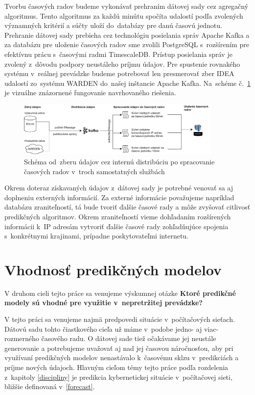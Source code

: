 \documentclass[thesismargins, thesislinespacing, openright, upjsfrontpage]{rnthesis}
\begin{document}
Tvorbu časových radov budeme vykonávať prehraním dátovej sady cez agregačný algoritmus. Tento algoritmus za každú minútu spočíta udalostí podľa zvolených významných kritérií a súčty uloží do~databázy pre danú časovú jednotu. Prehranie dátovej sady prebieha cez technológiu posielania správ Apache Kafka a za databázu pre uloženie časových radov sme zvolili PostgreSQL s~rozšírením pre efektívnu prácu s~časovými radmi TimescaleDB. Prístup posielania správ je zvolený z~dôvodu podpory neustáleho príjmu údajov. Pre spustenie rovnakého systému v~reálnej prevádzke budeme potrebovať len presmerovať zber IDEA udalostí zo~systému WARDEN do~našej inštancie Apache Kafka. Na~schéme č.~\ref{fig:c1_schema} je vizuálne znázornené fungovanie navrhovaného riešenia.

\begin{figure}[h]
  \centering
  \includegraphics[width=0.9\textwidth]{images/metodologia1.png}
  \caption{Schéma od~zberu údajov cez internú distribúciu po spracovanie časových radov v~troch samostatných službách}
  \label{fig:c1_schema}
\end{figure}

Okrem doteraz získavaných údajov z~dátovej sady je potrebné venovať sa aj doplneniu externých informácií. Za externé informácie považujeme napríklad databázu zraniteľností, tá bude tvoriť ďalšie časové rady a môže zvyšovať citlivosť predikčných algoritmov. Okrem zraniteľností vieme dohľadaním rozšírených informácii k~IP adresám vytvoriť ďalšie časové rady zohľadňujúce spojenia s~konkrétnymi krajinami, prípadne poskytovateľmi internetu.

\section{Vhodnosť predikčných modelov}
V druhom cieli tejto práce sa venujeme výskumnej otázke \textbf{Ktoré predikčné modely sú vhodné pre využitie v~nepretržitej prevádzke?}

V tejto práci sa venujeme najmä predpovedi situácie v~počítačových sieťach. Dátovú sadu tohto čiastkového cieľa už máme v~podobe jedno- aj viac- rozmerného časového radu. O dátovej sade tiež očakávame jej neustále generovanie a potrebujeme uvažovať aj nad jej časovou náročnosťou, aby pri využívaní predikčných modelov nenastávalo k~časovému sklzu v~predikciách a príjme nových údajoch. Hlavným cieľom témy tejto práce podľa rozdelenia z~kapitoly \ref{discipliny} je predikcia kybernetickej situácie v~počítačovej sieti, bližšie definovaná v~\ref{forecast}.
\end{document}
